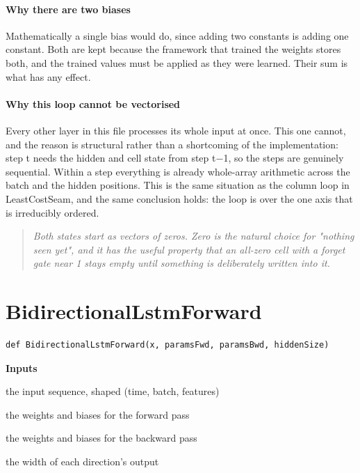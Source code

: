 \paragraph{Why there are two biases}
Mathematically a single bias would do, since adding two constants is adding one constant. Both are kept because the framework that trained the weights stores both, and the trained values must be applied as they were learned. Their sum is what has any effect.


\paragraph{Why this loop cannot be vectorised}
Every other layer in this file processes its whole input at once. This one cannot, and the reason is structural rather than a shortcoming of the implementation: step t needs the hidden and cell state from step t$-$1, so the steps are genuinely sequential. Within a step everything is already whole-array arithmetic across the batch and the hidden positions. This is the same situation as the column loop in LeastCostSeam, and the same conclusion holds: the loop is over the one axis that is irreducibly ordered.


\begin{quote}\small\itshape Both states start as vectors of zeros. Zero is the natural choice for "nothing seen yet", and it has the useful property that an all-zero cell with a forget gate near 1 stays empty until something is deliberately written into it.\end{quote}

\section{BidirectionalLstmForward}
\begin{lstlisting}[style=sig]
def BidirectionalLstmForward(x, paramsFwd, paramsBwd, hiddenSize)
\end{lstlisting}

\noindent\textbf{Inputs}
\begin{description}[leftmargin=2.2em,style=nextline,font=\normalfont\ttfamily]\setlength\itemsep{1pt}
  \item[{x}] \normalfont the input sequence, shaped (time, batch, features)
  \item[{paramsFwd}] \normalfont the weights and biases for the forward pass
  \item[{paramsBwd}] \normalfont the weights and biases for the backward pass
  \item[{hiddenSize}] \normalfont the width of each direction's output
\end{description}


